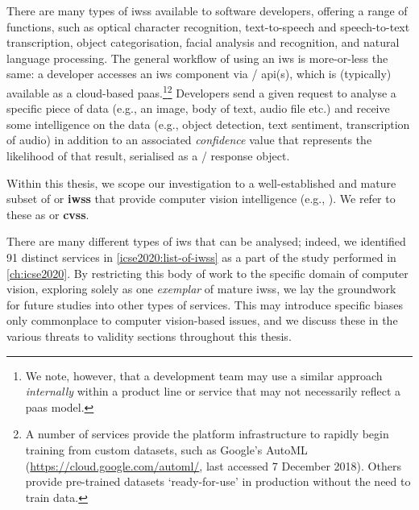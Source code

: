 There are many types of \glspl{iws} available to software developers, offering a range of functions, such as optical character recognition, text-to-speech and speech-to-text transcription, object categorisation, facial analysis and recognition, and natural language processing. The general workflow of using an \gls{iws} is more-or-less the same: a developer accesses an \gls{iws} component via / \gls{api}(s), which is (typically) available as a cloud-based \gls{paas}.\footnote{We note, however, that a development team may use a similar approach \textit{internally} within a product line or service that may not necessarily reflect a \gls{paas} model.}\footnote{A number of services provide the platform infrastructure to rapidly begin training from custom datasets, such as Google's AutoML (\url{https://cloud.google.com/automl/}, last accessed 7 December 2018). Others provide pre-trained datasets `ready-for-use' in production without the need to train data.} Developers send a given request to analyse a specific piece of data (e.g., an image, body of text, audio file etc.) and receive some intelligence on the data (e.g., object detection, text sentiment, transcription of audio) in addition to an associated \textit{confidence} value that represents the likelihood of that result, serialised as a / response object. 


\begin{callout}
Within this thesis, we scope our investigation to a well-established and mature \textup{subset} of \textbf{} or \textbf{\glspl{iws}} that provide computer vision intelligence (e.g., ). We refer to these as \textbf{} or \textbf{\glspl{cvs}}. 
\end{callout}

There are many different types of \gls{iws} that can be analysed; indeed, we identified 91 distinct services in \cref{icse2020:list-of-iwss} as a part of the study performed in \cref{ch:icse2020}. By restricting this body of work to the specific domain of computer vision, exploring solely  as one \textit{exemplar} of mature \glspl{iws}, we lay the groundwork for future studies into other types of services. This may introduce specific biases only commonplace to computer vision-based issues, and we discuss these in the various threats to validity sections throughout this thesis.

